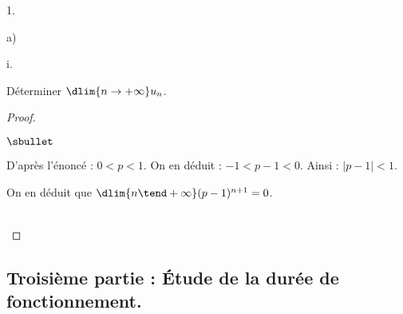 \begin{noliste}{1.}
\begin{noliste}{a)}
\begin{nonoliste}{i.}
    \item Déterminer $\dlim{n \to +\infty} u_n$. 

      \begin{proof}~%
        \begin{noliste}{$\sbullet$}
        \item D'après l'énoncé : $0 < p < 1$. On en déduit : $-1 < p-1
          < 0$. Ainsi : $|p - 1| < 1$.

        \item On en déduit que $\dlim{n \tend +\infty} (p-1)^{n+1} =
          0$.
        \end{noliste}
        ~\\[-1cm] 
      \end{proof}

    \end{nonoliste}
  \end{noliste}
\end{noliste}

\subsection*{Troisième partie : Étude de la durée de fonctionnement.}

